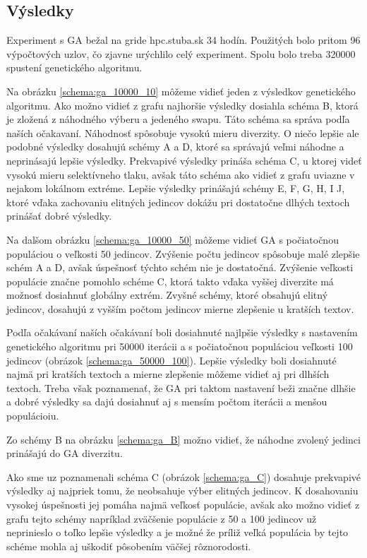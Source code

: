 \subsection{Výsledky}
Experiment s GA bežal na gride hpc.stuba.sk 34 hodín.
Použitých bolo pritom 96 výpočtových uzlov, čo zjavne urýchlilo celý experiment.
Spolu bolo treba 320000 spustení genetického algoritmu.

Na obrázku \ref{schema:ga_10000_10} môžeme vidieť jeden z výsledkov genetického algoritmu.
Ako možno vidieť z grafu najhoršie výsledky dosiahla schéma B, ktorá je zložená z náhodného výberu a jedeného swapu. Táto schéma sa správa podľa naších očakavaní. Náhodnosť spôsobuje vysokú mieru diverzity.
O niečo lepšie ale podobné výsledky dosahujú schémy A a D, ktoré sa správajú veľmi náhodne a neprinásajú lepšie výsledky.
Prekvapivé výsledky prináša schéma C, u ktorej videť vysokú mieru selektívneho tlaku, avšak táto schéma ako vidieť z grafu uviazne v nejakom lokálnom extréme.
Lepšie výsledky prinášajú schémy E, F, G, H, I J, ktoré vďaka zachovaniu elitných jedincov dokážu pri dostatočne dlhých textoch prinášať dobré výsledky.


Na dalšom obrázku \ref{schema:ga_10000_50} môžeme vidieť GA s počiatočnou populáciou o veľkosti 50 jedincov. Zvýšenie počtu jedincov spôsobuje malé zlepšie  schém A a D, avšak úspešnosť týchto schém nie je dostatočná. Zvýšenie veľkosti populácie značne pomohlo schéme C, ktorá takto vďaka vyššej diverzite má možnosť dosiahnuť globálny extrém. Zvyšné schémy, ktoré obsahujú elitný jedincov, dosahujú z vyšším počtom jedincov mierne zlepšenie u kratších textov. 


Podľa očakávaní naších očakávaní boli dosiahnuté najlpšie výsledky s nastavením genetického algoritmu pri 50000 iterácii a s počiatočnou populáciou veľkosti 100 jedincov (obrázok \ref{schema:ga_50000_100}). Lepšie výsledky boli dosiahnuté najmä pri kratších textoch a mierne zlepšenie môžeme vidieť aj pri dlhších textoch. Treba však poznamenať, že GA pri taktom nastavení beži značne dlhšie a dobré výsledky sa dajú dosiahnuť aj s mensím počtom iterácii a menšou populácioiu. 


Zo schémy B na obrázku \ref{schema:ga_B} možno vidieť, že náhodne zvolený jedinci prinášajú do GA diverzitu.


Ako sme uz poznamenali schéma C (obrázok \ref{schema:ga_C}) dosahuje prekvapivé výsledky aj najpriek tomu, že neobsahuje výber elitných jedincov. K dosahovaniu vysokej úspešnosti jej pomáha najmä veľkosť populácie, avšak ako možno vidieť z grafu tejto schémy napríklad zväčšenie populácie z 50 a 100 jedincov už neprinieslo o toľko lepšie výsledky a je možné že príliž veľká populácia by tejto schéme mohla aj uškodiť pôsobením väčšej rôznorodosti.


